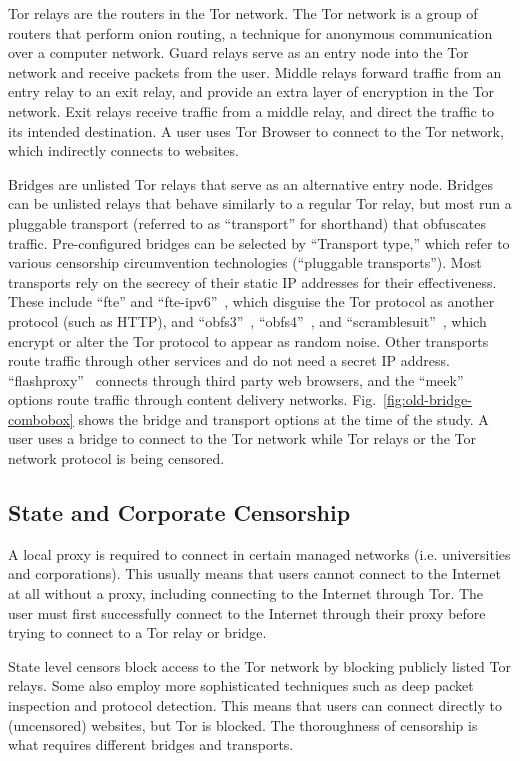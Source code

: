 \documentclass[USenglish,oneside,twocolumn]{article}
\begin{document}
Tor relays are the routers in the Tor network. The Tor network is a group of routers that perform onion routing, a technique for anonymous communication over a computer network.  
Guard relays serve as an entry node into the Tor network and receive packets from the user. Middle relays forward traffic from an entry relay to an exit relay, and provide an extra layer of encryption in the Tor network. Exit relays receive traffic from a middle relay, and direct the traffic to its intended destination. 
A user uses Tor Browser to connect to the Tor network, which indirectly connects to websites. 

Bridges are unlisted Tor relays that serve as an alternative entry node.
Bridges can be unlisted relays that behave similarly to a regular Tor relay,  
but most run a pluggable transport (referred to as ``transport'' for shorthand) that obfuscates traffic. 
Pre-configured bridges can be selected by ``Transport type,'' which refer to various
censorship circumvention technologies (``pluggable transports'').
Most transports rely on the secrecy of their static IP addresses for their effectiveness.
These include ``fte'' and ``fte-ipv6''~\cite{fte},
which disguise the Tor protocol as another protocol (such as HTTP), and
``obfs3''~\cite{obfs3}, ``obfs4''~\cite{obfs4}, and ``scramblesuit''~\cite{scramblesuit},
which encrypt or alter the Tor protocol to appear as random noise.
Other transports route traffic through other services and do not need a secret IP address. 
``flashproxy''~\cite{flashproxy} connects through third party web browsers,
and the ``meek''~\cite{fifield2015blocking} options route traffic
through content delivery networks. Fig.~\ref{fig:old-bridge-combobox} shows the bridge and transport options at the time of the study. A user uses a bridge to connect to the Tor network while Tor relays or the Tor network protocol is being censored. 

\subsection{State and Corporate Censorship}
A local proxy is required to connect in certain managed networks (i.e. universities and corporations). This usually means that users cannot connect to the Internet at all without a proxy, including connecting to the Internet through Tor. The user must first successfully connect to the Internet through their proxy before trying to connect to a Tor relay or bridge. 

State level censors block access to the Tor network by blocking publicly listed Tor relays. Some also employ more sophisticated techniques such as deep packet inspection and protocol detection. This means that users can connect directly to (uncensored) websites, but Tor is blocked. The thoroughness of censorship is what requires different bridges and transports. 
\end{document}
